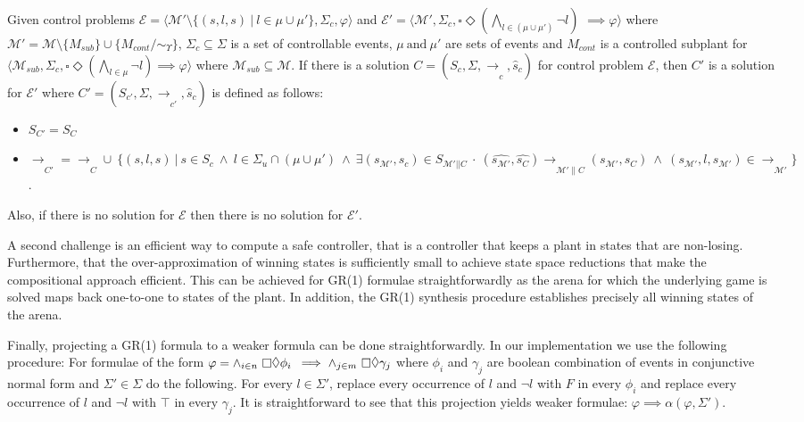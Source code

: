 \begin{theorem}
    \label{lemma:non-flooding-equivalence}
    Given  control problems $\mathcal{E} =  \langle \mathcal{M'} \setminus \{ (s, l, s) \ | \ l \in \mu \cup \mu' \}, \Sigma_c, \varphi \rangle$ and $\mathcal{E'} =  \langle \mathcal{M'}, \Sigma_c, 
     \square \Diamond (\bigwedge_{l \in (\mu \cup \mu')} \neg l)$ $\implies \varphi \rangle$ where $\mathcal{M'} = \mathcal{M} \setminus \{ M_{sub} \} \cup \{ M_{cont} \slash \! \sim_\Upsilon \}$, $\Sigma_c \subseteq \Sigma$ is a set of controllable events, $\mu \ \text{and} \ \mu'$ are sets of events and $M_{cont}$ is a controlled subplant for $\langle \mathcal{M}_{sub}, \Sigma_c, \square \Diamond (\bigwedge_{l \in \mu} \neg l) \implies \varphi\rangle$ where $\mathcal{
     M}_{sub} \subseteq \mathcal{M}$. If there is a solution $C = (S_c, \Sigma, \xrightarrow[]{}_{c}, \hat{s}_c)$ for control problem $\mathcal{E}$, then $C'$ is a solution for $\mathcal{E'}$ where $C' = (S_{c'}, \Sigma, \xrightarrow[]{}_{c'}, \hat{s}_c)$ is defined as follows:
     \begin{itemize}
         \item $S_{C'} = S_C$
         \item $\xrightarrow[]{}_{C'} =  \xrightarrow[]{}_{C} \cup \ \{ (s, l, s) \ | \ s \in S_c \ \wedge \ l \in \Sigma_u \cap (\mu \cup \mu') \ \wedge \ \exists (s_{\mathcal{M'}}, s_{c}) \in S_{\mathcal{M'}||C} \ \cdot \ (\hat{s_{\mathcal{M'}}}, \hat{s_{C}}) \xrightarrow[]{}_{\mathcal{M'}\|C} (s_{\mathcal{M'}}, s_{C}) \ \wedge \ (s_{\mathcal{M'}}, l, s_{\mathcal{M'}}) \in \xrightarrow[]{}_{\mathcal{M'}} \}$. 
     \end{itemize}
     Also, if there is no solution for $\mathcal{E}$ then there is no solution for $\mathcal{E}'$. 
\end{theorem}

A second challenge is an efficient way to compute a safe controller, that is a controller that keeps a plant in states that are non-losing. Furthermore, that the over-approximation of winning states is sufficiently small to achieve state space reductions that make the compositional approach efficient. This can be achieved for GR(1) formulae straightforwardly as the arena for which the underlying game is solved maps back one-to-one to states of the plant. In addition, the GR(1) synthesis procedure\cite{Piterman:2006:SRD} establishes precisely all winning states of the arena. 

Finally, projecting a GR(1) formula to a weaker formula can be done straightforwardly. In our implementation we use the following procedure: For formulae of the form 
 $\varphi = \wedge_{i \in n} \ \always\eventually \phi_i$ $ \implies \wedge_{j \in m} \ \always\eventually \gamma_j$ where $\phi_i$ and $\gamma_j$ are boolean combination of events in conjunctive normal form and $\Sigma' \in \Sigma$ do the following. For every $l \in \Sigma'$, replace every occurrence of $l$ and $\neg l$ with $F$ in every $\phi_i$ and replace every occurrence of $l$ and $\neg l$ with $\top$ in every $\gamma_j$. It is straightforward to see that this projection yields weaker formulae: $\varphi \implies \alpha(\varphi, \Sigma')$.

